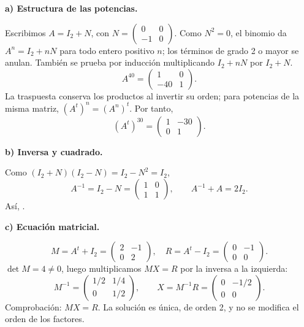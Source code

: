 \textbf{a) Estructura de las potencias.}\par\nopagebreak[4]
Escribimos $A=I_2+N$, con $N=\begin{pmatrix}0&0\\-1&0\end{pmatrix}$. Como $N^2=0$, el binomio da $A^n=I_2+nN$ para todo entero positivo $n$; los términos de grado 2 o mayor se anulan. También se prueba por inducción multiplicando $I_2+nN$ por $I_2+N$.
\[
\boxed{A^{40}=\begin{pmatrix}1&0\\-40&1\end{pmatrix}.}
\]
La traspuesta conserva los productos al invertir su orden; para potencias de la misma matriz, $(A^t)^n=(A^n)^t$. Por tanto,
\[
\boxed{(A^t)^{30}=\begin{pmatrix}1&-30\\0&1\end{pmatrix}.}
\]

\textbf{b) Inversa y cuadrado.}\par\nopagebreak[4]
Como $(I_2+N)(I_2-N)=I_2-N^2=I_2$,
\[
A^{-1}=I_2-N=\begin{pmatrix}1&0\\1&1\end{pmatrix},\qquad A^{-1}+A=2I_2.
\]
Así, .

\textbf{c) Ecuación matricial.}\par\nopagebreak[4]
\[
M=A^t+I_2=\begin{pmatrix}2&-1\\0&2\end{pmatrix},\quad
R=A^t-I_2=\begin{pmatrix}0&-1\\0&0\end{pmatrix}.
\]
$\det M=4\ne0$, luego multiplicamos $MX=R$ por la inversa a la izquierda:
\[
M^{-1}=\begin{pmatrix}1/2&1/4\\0&1/2\end{pmatrix},\qquad
\boxed{X=M^{-1}R=\begin{pmatrix}0&-1/2\\0&0\end{pmatrix}.}
\]
Comprobación: $MX=R$. La solución es única, de orden 2, y no se modifica el orden de los factores.
